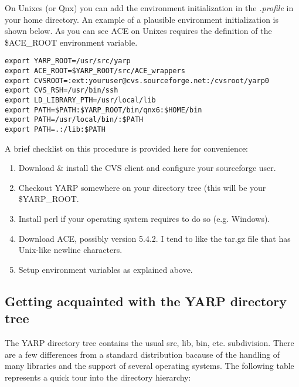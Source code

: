 On Unixes (or Qnx) you can add the environment initialization in the {\em .profile} in your home directory. An example of a plausible environment initialization is shown below. As you can see ACE on Unixes requires the definition of the \$ACE\_ROOT environment variable.

\begin{verbatim}
export YARP_ROOT=/usr/src/yarp
export ACE_ROOT=$YARP_ROOT/src/ACE_wrappers
export CVSROOT=:ext:youruser@cvs.sourceforge.net:/cvsroot/yarp0
export CVS_RSH=/usr/bin/ssh
export LD_LIBRARY_PTH=/usr/local/lib
export PATH=$PATH:$YARP_ROOT/bin/qnx6:$HOME/bin
export PATH=/usr/local/bin/:$PATH
export PATH=.:/lib:$PATH
\end{verbatim}

A brief checklist on this procedure is provided here for convenience:
\begin{enumerate}
	\item Download \& install the CVS client and configure your sourceforge user.
	\item Checkout YARP  somewhere on your directory tree (this will be your \$YARP\_ROOT.
	\item Install perl if your operating system requires to do so (e.g. Windows).
	\item Download ACE, possibly version 5.4.2. I tend to like the tar.gz file that has Unix-like newline characters.
	\item Setup environment variables as explained above.
\end{enumerate}

\subsection{Getting acquainted with the YARP directory tree}
The YARP directory tree contains the usual src, lib, bin, etc. subdivision. There are a few differences from a standard distribution bacause of the handling of many libraries and the support of several operating systems. The following table represents a quick tour into the directory hierarchy:

